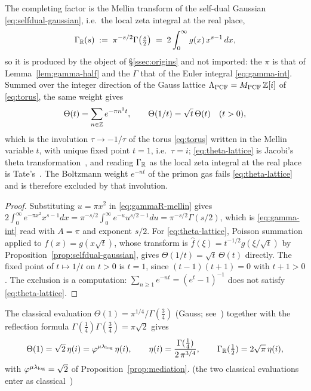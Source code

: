 \begin{proposition}\label{prop:archimedean}
The completing factor is the Mellin transform of the self-dual Gaussian
\eqref{eq:selfdual-gaussian}, i.e.\ the local zeta integral at the real place,
\begin{equation}\label{eq:gammaR-mellin}
  \Gamma_{\mathbb{R}}(s)\;:=\;\pi^{-s/2}\Gamma\!\left(\tfrac s2\right)
  \;=\;2\int_{0}^{\infty} g(x)\,x^{s-1}\,dx ,
\end{equation}
so it is produced by the object of \S\ref{ssec:origins} and not imported: the $\pi$ is
that of Lemma~\ref{lem:gamma-half} and the $\Gamma$ that of the Euler integral
\eqref{eq:gamma-int}. Summed over the integer direction of the Gauss lattice
$\Lambda_{\mathrm{PCF}}=M_{\mathrm{PCF}}\,\mathbb{Z}[i]$ of \eqref{eq:torus}, the same weight gives
\begin{equation}\label{eq:theta-lattice}
  \Theta(t)=\sum_{n\in\mathbb{Z}}e^{-\pi n^{2}t},\qquad
  \Theta(1/t)=\sqrt t\,\Theta(t)\quad(t>0),
\end{equation}
which is the involution $\tau\to-1/\tau$ of the torus \eqref{eq:torus} written in the Mellin
variable $t$, with unique fixed point $t=1$, i.e.\ $\tau=i$; \eqref{eq:theta-lattice} is
Jacobi's theta transformation~\cite{Jacobi1829}, and reading $\Gamma_{\mathbb{R}}$ as the local zeta
integral at the real place is Tate's~\cite{Tate1967}. The Boltzmann weight $e^{-nt}$ of the primon gas fails
\eqref{eq:theta-lattice} and is therefore excluded by that involution.%

%
\end{proposition}
\begin{proof}
Substituting $u=\pi x^{2}$ in \eqref{eq:gammaR-mellin} gives
$2\int_{0}^{\infty}e^{-\pi x^{2}}x^{s-1}dx=\pi^{-s/2}\int_{0}^{\infty}e^{-u}u^{s/2-1}du
=\pi^{-s/2}\Gamma(s/2)$, which is \eqref{eq:gamma-int} read with $A=\pi$ and exponent
$s/2$. For \eqref{eq:theta-lattice}, Poisson summation applied to $f(x)=g(x\sqrt t)$,
whose transform is $\widehat f(\xi)=t^{-1/2}g(\xi/\sqrt t)$ by
Proposition~\ref{prop:selfdual-gaussian}, gives $\Theta(1/t)=\sqrt t\,\Theta(t)$
directly. The fixed point of $t\mapsto1/t$ on $t>0$ is $t=1$, since
$(t-1)(t+1)=0$ with $t+1>0$. The exclusion is a computation:
$\sum_{n\ge1}e^{-nt}=(e^{t}-1)^{-1}$ does not satisfy \eqref{eq:theta-lattice}.
\end{proof}

\begin{remark}\label{rmk:eta-i}
The classical evaluation $\Theta(1)=\pi^{1/4}/\Gamma(\tfrac34)$ (Gauss;
see~\cite{Jacobi1829}) together with the reflection formula $\Gamma(\tfrac14)\Gamma(\tfrac34)=\pi\sqrt2$ gives
\begin{equation}\label{eq:eta-i}
  \Theta(1)=\sqrt2\,\eta(i)=\varphi^{\mu\lambda_{\log}}\,\eta(i),\qquad
  \eta(i)=\frac{\Gamma(\tfrac14)}{2\,\pi^{3/4}},\qquad
  \Gamma_{\mathbb{R}}(\tfrac12)=2\sqrt\pi\,\eta(i),
\end{equation}
with $\varphi^{\mu\lambda_{\log}}=\sqrt2$ of Proposition~\ref{prop:mediation}. (the two classical evaluations enter as classical~\cite{Jacobi1829})
\end{remark}

